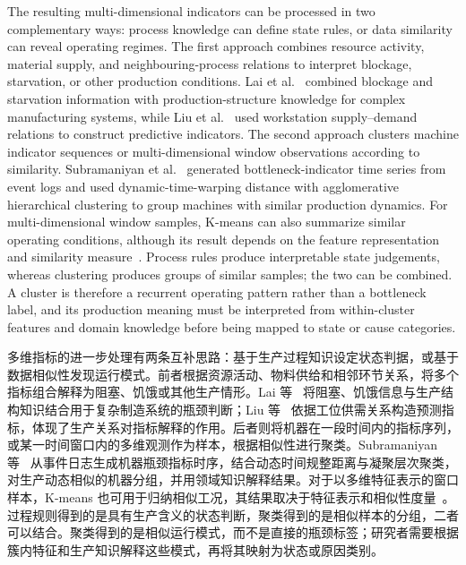 \documentclass[a4paper,fleqn]{cas-dc}
\newcommand{\zhpara}[1]{%
  \par\begingroup\small\color{black!72}\noindent #1\par\endgroup}
\begin{document}
The resulting multi-dimensional indicators can be processed in two complementary ways: process knowledge can define state rules, or data similarity can reveal operating regimes. The first approach combines resource activity, material supply, and neighbouring-process relations to interpret blockage, starvation, or other production conditions. Lai et al.~\cite{lai2021data} combined blockage and starvation information with production-structure knowledge for complex manufacturing systems, while Liu et al.~\cite{liu2023lstmdam} used workstation supply--demand relations to construct predictive indicators. The second approach clusters machine indicator sequences or multi-dimensional window observations according to similarity. Subramaniyan et al.~\cite{subramaniyan2020clustering} generated bottleneck-indicator time series from event logs and used dynamic-time-warping distance with agglomerative hierarchical clustering to group machines with similar production dynamics. For multi-dimensional window samples, K-means can also summarize similar operating conditions, although its result depends on the feature representation and similarity measure~\cite{jain2010clustering}. Process rules produce interpretable state judgements, whereas clustering produces groups of similar samples; the two can be combined. A cluster is therefore a recurrent operating pattern rather than a bottleneck label, and its production meaning must be interpreted from within-cluster features and domain knowledge before being mapped to state or cause categories.

\zhpara{多维指标的进一步处理有两条互补思路：基于生产过程知识设定状态判据，或基于数据相似性发现运行模式。前者根据资源活动、物料供给和相邻环节关系，将多个指标组合解释为阻塞、饥饿或其他生产情形。Lai 等~\cite{lai2021data} 将阻塞、饥饿信息与生产结构知识结合用于复杂制造系统的瓶颈判断；Liu 等~\cite{liu2023lstmdam} 依据工位供需关系构造预测指标，体现了生产关系对指标解释的作用。后者则将机器在一段时间内的指标序列，或某一时间窗口内的多维观测作为样本，根据相似性进行聚类。Subramaniyan 等~\cite{subramaniyan2020clustering} 从事件日志生成机器瓶颈指标时序，结合动态时间规整距离与凝聚层次聚类，对生产动态相似的机器分组，并用领域知识解释结果。对于以多维特征表示的窗口样本，K-means 也可用于归纳相似工况，其结果取决于特征表示和相似性度量~\cite{jain2010clustering}。过程规则得到的是具有生产含义的状态判断，聚类得到的是相似样本的分组，二者可以结合。聚类得到的是相似运行模式，而不是直接的瓶颈标签；研究者需要根据簇内特征和生产知识解释这些模式，再将其映射为状态或原因类别。}
\end{document}
